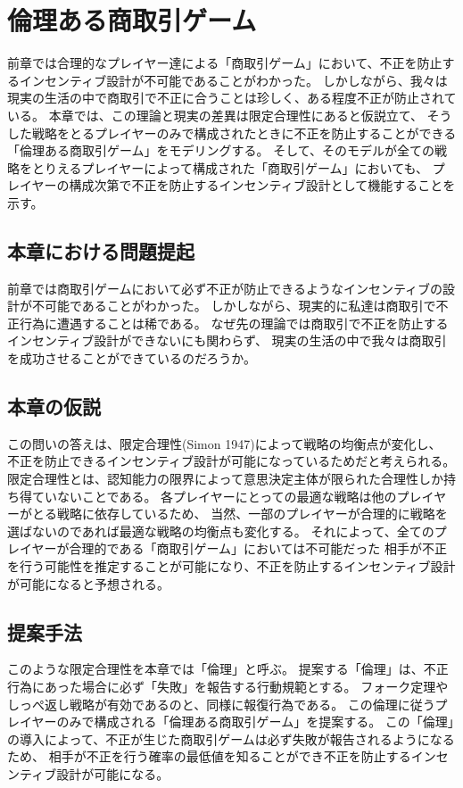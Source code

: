 \chapter{倫理ある商取引ゲーム}
前章では合理的なプレイヤー達による「商取引ゲーム」において、不正を防止するインセンティブ設計が不可能であることがわかった。
しかしながら、我々は現実の生活の中で商取引で不正に合うことは珍しく、ある程度不正が防止されている。
本章では、この理論と現実の差異は限定合理性にあると仮説立て、
そうした戦略をとるプレイヤーのみで構成されたときに不正を防止することができる「倫理ある商取引ゲーム」をモデリングする。
そして、そのモデルが全ての戦略をとりえるプレイヤーによって構成された「商取引ゲーム」においても、
プレイヤーの構成次第で不正を防止するインセンティブ設計として機能することを示す。

\section{本章における問題提起}
前章では商取引ゲームにおいて必ず不正が防止できるようなインセンティブの設計が不可能であることがわかった。
しかしながら、現実的に私達は商取引で不正行為に遭遇することは稀である。
なぜ先の理論では商取引で不正を防止するインセンティブ設計ができないにも関わらず、
現実の生活の中で我々は商取引を成功させることができているのだろうか。

\section{本章の仮説}
この問いの答えは、限定合理性(Simon 1947\cite{simon 1947})によって戦略の均衡点が変化し、
不正を防止できるインセンティブ設計が可能になっているためだと考えられる。
限定合理性とは、認知能力の限界によって意思決定主体が限られた合理性しか持ち得ていないことである。
各プレイヤーにとっての最適な戦略は他のプレイヤーがとる戦略に依存しているため、
当然、一部のプレイヤーが合理的に戦略を選ばないのであれば最適な戦略の均衡点も変化する。
それによって、全てのプレイヤーが合理的である「商取引ゲーム」においては不可能だった
相手が不正を行う可能性を推定することが可能になり、不正を防止するインセンティブ設計が可能になると予想される。

\section{提案手法}
このような限定合理性を本章では「倫理」と呼ぶ。
提案する「倫理」は、不正行為にあった場合に必ず「失敗」を報告する行動規範とする。
フォーク定理やしっぺ返し戦略が有効であるのと、同様に報復行為である。
この倫理に従うプレイヤーのみで構成される「倫理ある商取引ゲーム」を提案する。
この「倫理」の導入によって、不正が生じた商取引ゲームは必ず失敗が報告されるようになるため、
相手が不正を行う確率の最低値を知ることができ不正を防止するインセンティブ設計が可能になる。

